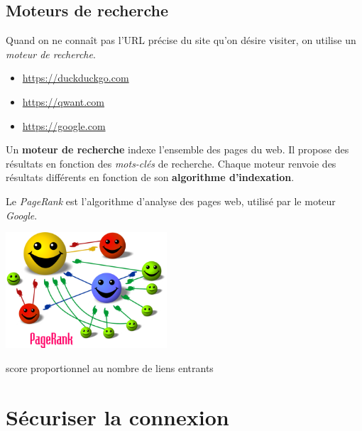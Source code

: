 \documentclass[a4paper,11pt]{article}
\begin{document}
\begin{Form}
\subsection{Moteurs de recherche}
Quand on ne connaît pas l'URL précise du site qu'on désire visiter, on utilise un \emph{moteur de recherche}.
\begin{itemize}
\item \url{https://duckduckgo.com}
\item \url{https://qwant.com}
\item \url{https://google.com}
\end{itemize}
\begin{aretenir}[]
Un \textbf{moteur de recherche} indexe l'ensemble des pages du web. Il propose des résultats en fonction des \emph{mots-clés} de recherche. Chaque moteur renvoie des résultats différents en fonction de son \textbf{algorithme d'indexation}.
\end{aretenir}
Le \emph{PageRank} est l'algorithme d'analyse des pages web, utilisé par le moteur \emph{Google}.
\begin{center}
\centering
\includegraphics[width=6cm]{ressources/pagerank.png}
\label{pagerank}
\end{center}
\begin{commentprof}
score proportionnel au nombre de liens entrants
\end{commentprof}
\section{Sécuriser la connexion}

\end{Form}
\end{document}
